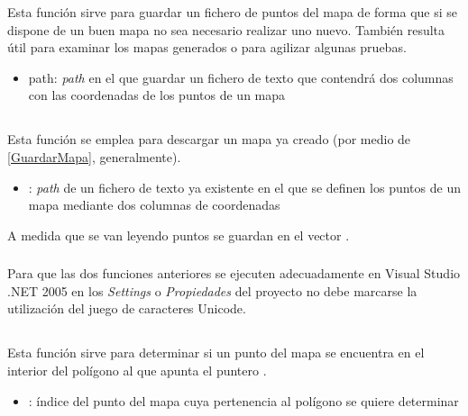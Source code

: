 Esta función sirve para guardar un fichero de puntos del mapa de forma que si se dispone de un buen mapa no sea necesario realizar uno nuevo. También resulta útil para examinar los mapas generados o para agilizar algunas pruebas.

\begin{itemize}
  \item path:  \emph{path} en el que guardar un fichero de texto que contendrá dos columnas con las coordenadas de los puntos de un mapa
\end{itemize}

\subsection{}


Esta función se emplea para descargar un mapa ya creado (por medio de \ref{GuardarMapa}, generalmente).

\begin{itemize}
  \item {}:  \emph{path} de un fichero de texto ya existente en el que se definen los puntos de un mapa mediante dos columnas de coordenadas
\end{itemize}

A medida que se van leyendo puntos se guardan en el vector .

\subsubsection{}
Para que las dos funciones anteriores se ejecuten adecuadamente en Visual Studio .NET 2005 en los \emph{Settings} o \emph{Propiedades} del proyecto no debe marcarse la utilización del juego de caracteres Unicode.

\subsection{}\label{PuntoEnPol}


Esta función sirve para determinar si un punto del mapa se encuentra en el interior del polígono al que apunta el puntero .

\begin{itemize}
  \item {}: índice del punto del mapa cuya pertenencia al polígono se quiere determinar
\end{itemize}

